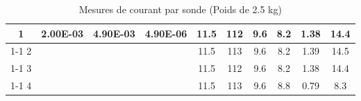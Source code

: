 \begin{table}[H]
{\begin{tabular}{|c|c|c|c|c|c|c|c|c|c|}
            1         & \multirow{4}{*}{2.00E-03}                                  & \multirow{4}{*}{4.90E-03} & \multirow{4}{*}{4.90E-06}                               & 11.5                                                     & 112                                                     & 9.6                                                                 & 8.2                                                              & 1.38   & 14.4                                                              \\ \cline{1-1} \cline{5-10}
            2         &                                                            &                           &                                                         & 11.5                                                     & 113                                                     & 9.6                                                                 & 8.2                                                              & 1.39   & 14.5                                                              \\ \cline{1-1} \cline{5-10}
            3         &                                                            &                           &                                                         & 11.5                                                     & 112                                                     & 9.6                                                                 & 8.2                                                              & 1.38   & 14.4                                                              \\ \cline{1-1} \cline{5-10}
            4         &                                                            &                           &                                                         & 11.5                                                     & 113                                                     & 9.6                                                                 & 8.8                                                              & 0.79   & 8.3                                                               \\ \hline
        \end{tabular}%
    }
    \caption{Mesures de courant par sonde (Poids de 2.5 kg)}
    \label{tab:poids_2_5_sonde}
\end{table}

